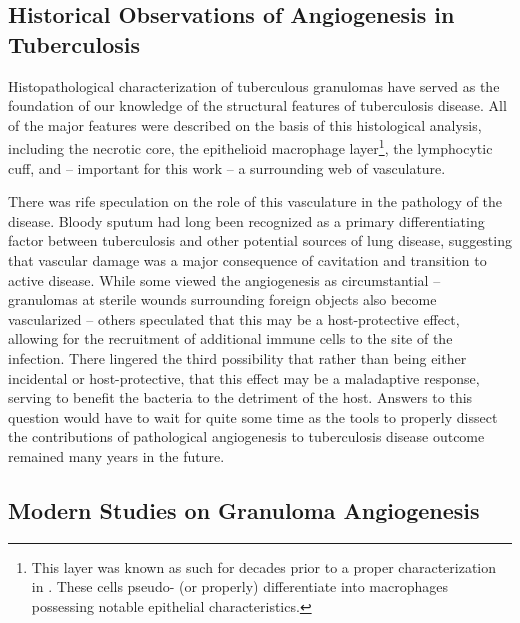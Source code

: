 \subsection{Historical Observations of Angiogenesis in Tuberculosis}\label{histtbang}

Histopathological characterization of tuberculous granulomas have served as the foundation of our knowledge of the structural features of tuberculosis disease. All of the major features were described on the basis of this histological analysis, including the necrotic core, the epithelioid macrophage layer\footnote{This layer was known as such for decades prior to a proper characterization in \citet{Cronan2016}. These cells pseudo\hyp{} (or properly) differentiate into macrophages possessing notable epithelial characteristics.}, the lymphocytic cuff, and -- important for this work -- a surrounding web of vasculature. 

There was rife speculation on the role of this vasculature in the pathology of the disease. Bloody sputum had long been recognized as a primary differentiating factor between tuberculosis and other potential sources of lung disease, suggesting that vascular damage was a major consequence of cavitation and transition to active disease. While some viewed the angiogenesis as circumstantial -- granulomas at sterile wounds surrounding foreign objects also become vascularized -- others speculated that this may be a host\hyp{}protective effect, allowing for the recruitment of additional immune cells to the site of the infection. There lingered the third possibility that rather than being either incidental or host\hyp{}protective, that this effect may be a maladaptive response, serving to benefit the bacteria to the detriment of the host. Answers to this question would have to wait for quite some time as the tools to properly dissect the contributions of pathological angiogenesis to tuberculosis disease outcome remained many years in the future.

\subsection{Modern Studies on Granuloma Angiogenesis}\label{granang}

